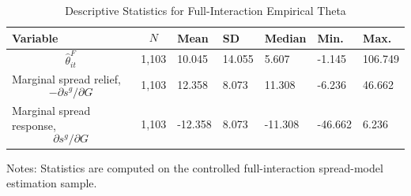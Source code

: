 \begin{table}[H]\centering
\begin{threeparttable}
\caption{Descriptive Statistics for Full-Interaction Empirical Theta}
\label{tab:theta_descriptive_stats}
\scriptsize
\begin{tabularx}{\textwidth}{lYYYYYY}
\toprule
Variable & $$N$$ & Mean & SD & Median & Min. & Max. \\
\midrule
$$\widehat{\theta}^{F}_{it}$$ & 1,103 & 10.045 & 14.055 & 5.607 & -1.145 & 106.749 \\
Marginal spread relief, $$-\partial s^g/\partial G$$ & 1,103 & 12.358 & 8.073 & 11.308 & -6.236 & 46.662 \\
Marginal spread response, $$\partial s^g/\partial G$$ & 1,103 & -12.358 & 8.073 & -11.308 & -46.662 & 6.236 \\
\bottomrule
\end{tabularx}
\begin{tablenotes}[flushleft]\footnotesize
\item Notes: Statistics are computed on the controlled full-interaction spread-model estimation sample.
\end{tablenotes}
\end{threeparttable}
\end{table}
